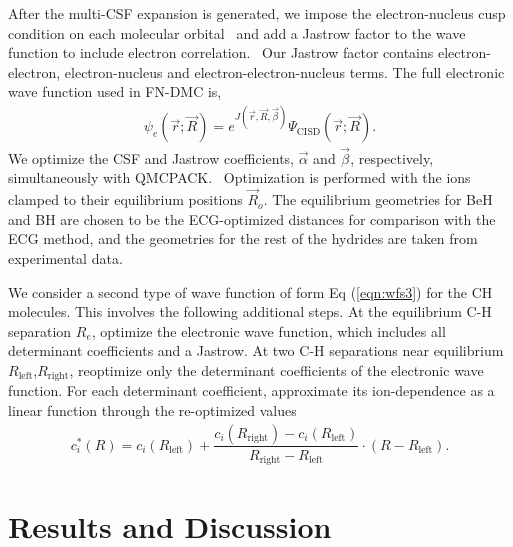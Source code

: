 \documentclass[aip,jcp,numerical,reprint]{revtex4-1}
\begin{document}
After the multi-CSF expansion is generated, we impose the electron-nucleus cusp condition on each molecular orbital~\cite{cusp} and add a Jastrow factor to the wave function to include electron correlation.~\cite{Kato} Our Jastrow factor contains electron-electron, electron-nucleus and electron-electron-nucleus terms. The full electronic wave function used in FN-DMC is,
\begin{align}
\psi_e(\vec{r};\vec{R})=e^{J(\vec{r},\vec{R},\vec{\beta})}\Psi_{\text{CISD}}(\vec{r};\vec{R})\label{eq:psie}.
\end{align}
We optimize the CSF and Jastrow coefficients, $\vec{\alpha}$ and $\vec{\beta}$, respectively, simultaneously with QMCPACK.~\cite{QMCPACK_Kim,QMCPACK_Esler} Optimization is performed with the ions clamped to their equilibrium positions $\vec{R}_o$. The equilibrium geometries for BeH and BH are chosen to be the ECG-optimized distances for comparison with the ECG  method, and the geometries for the rest of the hydrides are taken from experimental data.

We consider a second type of wave function of form Eq (\ref{eqn:wfs3}) for the CH molecules.  This involves the following additional steps. At the equilibrium C-H separation $R_e$, optimize the electronic wave function, which includes all determinant coefficients and a Jastrow. At two C-H separations near equilibrium $R_{\text{left}}$,$R_{\text{right}}$, reoptimize only the determinant coefficients of the electronic wave function. For each determinant coefficient, approximate its ion-dependence as a linear function through the re-optimized values
\begin{align}
c_i^*(R) = c_i(R_{\text{left}}) + 
\dfrac{c_i(R_{\text{right}}) - c_i(R_{\text{left}})}{R_{\text{right}}-R_{\text{left}}}\cdot(R-R_{\text{left}}).
\end{align}

\section{Results and Discussion}
\end{document}
